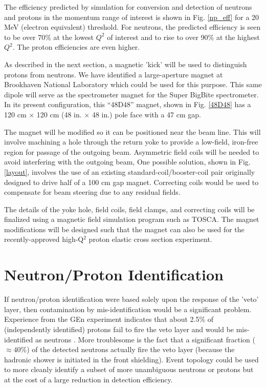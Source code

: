 \documentclass[12pt,letterpaper,oneside]{article}
\begin{document}
The efficiency predicted by simulation \cite{BH_simulation}  for 
conversion and detection of neutrons and protons
in the momentum range of interest is shown in Fig. \ref{np_eff}
for a 20 MeV (electron equivalent) threshold.
For neutrons, the predicted efficiency is seen to be over 70\% at the
lowest $Q^2$ of interest and to rise to over 90\% at the highest
$Q^2$.  The proton efficiencies are even higher.


As described in the next section, a magnetic 'kick' will be used to
distinguish protons from neutrons.
We have identified a large-aperture magnet at Brookhaven National
Laboratory which could be used for this purpose.  
This same dipole will serve as the
spectrometer magnet for the Super BigBite spectrometer.
In its present
configuration, this ``48D48'' magnet, shown in Fig. \ref{48D48} 
has a 120 cm $\times$ 120 cm
(48 in. $\times$ 48 in.) pole face with a 47 cm gap.

The magnet will be modified so it can be positioned near 
the beam line.  This will involve machining a hole through
the return yoke to provide a low-field, iron-free region 
for passage of the outgoing
beam.  Asymmetric field coils will be needed to avoid interfering
with the outgoing beam,  One possible solution,
shown in Fig. \ref{layout}, involves the use of an existing
standard-coil/booster-coil pair originally designed to drive half of a
100 cm gap magnet.   Correcting coils would be used to compensate
for beam steering due to any residual fields.

The details of the yoke hole,
field coils, field clamps, and correcting coils will be finalized using a
magnetic field simulation program such as TOSCA.  The magnet
modifications will be designed such that the magnet 
can also be used for the
recently-approved high-Q$^2$ proton elastic cross section
experiment\cite{E12-07-108}.  


\section{Neutron/Proton Identification}

If neutron/proton identification were based
solely upon the response of the 'veto' layer, then
contamination by mis-identification would be a significant problem.
Experience from the GEn experiment\cite{GEn-proposal}  
indicates that about 2.5\% of
(independently identified) protons fail to fire the veto layer and would be
mis-identified as neutrons \cite{Seamus}.  More troublesome is the fact that a
significant fraction ($\approx 40\%$) of the detected neutrons
actually fire the veto layer (because the hadronic shower is initiated
in the front shielding).  Event topology could be used to more cleanly
identify a subset of more unambiguous neutrons or protons but at the
cost of a large reduction in detection efficiency.
\end{document}
